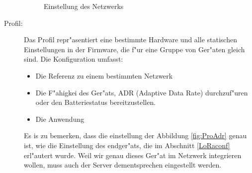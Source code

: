 \begin{description}
	\begin{figure}[h!]
		\centering
		\caption{Einstellung des Netzwerks}
	\end{figure}


	
	\item[Profil:] Das Profil repr"asentiert eine bestimmte Hardware und
	alle statischen Einstellungen in der Firmware, die f"ur eine Gruppe
	von Ger"aten gleich sind. Die Konfiguration umfasst:
	\begin{itemize}
		\item Die Referenz zu einem bestimmten Netzwerk
		\item Die F"ahigkei des Ger"ats, ADR (Adaptive Data Rate)
		durchzuf"uren oder den Batteriestatus bereitzustellen.
		\item Die Anwendung
	\end{itemize} 
	Es is zu bemerken, dass die einstellung der Abbildung
	\ref{fig:ProAdr} genau ist, wie die Einstellung des endger"ats, die
	im Abschnitt \ref{LoRaconf} erl"autert wurde. Weil wir genau dieses
	Ger"at im Netzwerk integrieren wollen, muss auch der Server
	dementsprechen eingestellt werden.


\end{description}
